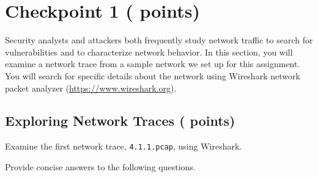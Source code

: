   \setcounter{pts-hosts}{3}
 \setcounter{pts-tcp}{1}
 \setcounter{pts-gw}{2}
 \setcounter{pts-ftp}{3}
 \setcounter{pts-portscan}{1}
\setcounter{pts-cp1.1}{
    \value{pts-hosts}+\value{pts-tcp}+\value{pts-gw}+\value{pts-ftp}+\value{pts-portscan}
}
 \setcounter{pts-year}{1}
 \setcounter{pts-domain}{1}
 \setcounter{pts-cslist}{1}
 \setcounter{pts-servercs}{1}
 \setcounter{pts-name}{2}
 \setcounter{pts-msg}{3}
 \setcounter{pts-cookie}{1}
\setcounter{pts-cp1.2}{
    \value{pts-domain}+\value{pts-cslist}+\value{pts-servercs}+\value{pts-year}+\value{pts-name}+\value{pts-msg}+\value{pts-cookie}
}
\setcounter{pts-cp1}{\value{pts-cp1.1}+\value{pts-cp1.2}}

\section{Checkpoint 1 ( points)}
\label{sec:cp1}

Security analysts and attackers both frequently study network traffic to search for vulnerabilities and to characterize network behavior.
In this section, you will examine a network trace from a sample network we set up for this assignment.
You will search for specific details about the network using Wireshark network packet analyzer (\url{https://www.wireshark.org}).

\subsection{Exploring Network Traces ( points)}
\label{sec:cp1.1}
Examine the first network trace, \texttt{4.1.1.pcap}, using Wireshark.

\medskip

Provide concise answers to the following questions.

\newcommand{\filemac}{\ref*{sec:cp1.1}.\ref*{itm:macip}\_mac.txt}
\newcommand{\fileip}{\ref*{sec:cp1.1}.\ref*{itm:macip}\_ip.txt}
\newcommand{\filetcp}{\ref*{sec:cp1.1}.\ref*{itm:tcp}.txt}
\newcommand{\filegw}{\ref*{sec:cp1.1}.\ref*{itm:gw}.txt}
\newcommand{\fileactive}{\ref*{sec:cp1.1}.\ref*{itm:ftp}\_active.txt}
\newcommand{\filepassive}{\ref*{sec:cp1.1}.\ref*{itm:ftp}\_passive.txt}
\newcommand{\fileportscan}{\ref*{sec:cp1.1}.\ref*{itm:portscan}.txt}

